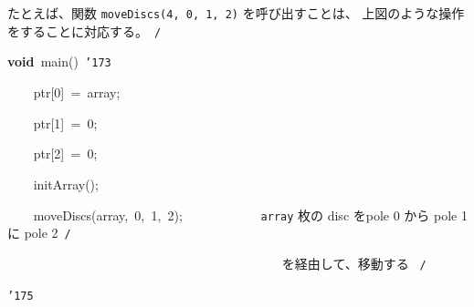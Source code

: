 \documentclass[a4paper,10pt]{article}
\def\mc{\relax}
\begin{document}
たとえば、関数 {\tt moveDiscs(4, 0, 1, 2)} を呼び出すことは、
上図のような操作をすることに対応する。\hfill \rm\mc \ {\tt *}{\tt /}
\tt\mc 

\noindent
\mbox{}\hfill

\noindent
\mbox{}\textbf{void}{\tt\mc \ }main(){\tt\mc \ }{\tt\char'173}

\noindent
\mbox{}{\tt\mc \ }{\tt\mc \ }{\tt\mc \ }{\tt\mc \ }ptr[0]{\tt\mc \ }={\tt\mc \ }array;

\noindent
\mbox{}{\tt\mc \ }{\tt\mc \ }{\tt\mc \ }{\tt\mc \ }ptr[1]{\tt\mc \ }={\tt\mc \ }0;

\noindent
\mbox{}{\tt\mc \ }{\tt\mc \ }{\tt\mc \ }{\tt\mc \ }ptr[2]{\tt\mc \ }={\tt\mc \ }0;

\noindent
\mbox{}\hfill

\noindent
\mbox{}{\tt\mc \ }{\tt\mc \ }{\tt\mc \ }{\tt\mc \ }initArray();

\noindent
\mbox{}{\tt\mc \ }{\tt\mc \ }{\tt\mc \ }{\tt\mc \ }moveDiscs(array,{\tt\mc \ }0,{\tt\mc \ }1,{\tt\mc \ }2);{\tt\mc \ }{\tt\mc \ }{\tt\mc \ }{\tt\mc \ }{\tt\mc \ }{\tt\mc \ }{\tt\mc \ }{\tt\mc \ }{\tt\mc \ }{\tt\mc \ }\rm\mc {\tt /}{\tt *}\  \ {\tt array} 枚の disc をpole 0 から pole 1 に pole 2\hfill \rm\mc \ {\tt *}{\tt /}
\tt\mc 

\noindent
\mbox{}{\tt\mc \ }{\tt\mc \ }{\tt\mc \ }{\tt\mc \ }{\tt\mc \ }{\tt\mc \ }{\tt\mc \ }{\tt\mc \ }{\tt\mc \ }{\tt\mc \ }{\tt\mc \ }{\tt\mc \ }{\tt\mc \ }{\tt\mc \ }{\tt\mc \ }{\tt\mc \ }{\tt\mc \ }{\tt\mc \ }{\tt\mc \ }{\tt\mc \ }{\tt\mc \ }{\tt\mc \ }{\tt\mc \ }{\tt\mc \ }{\tt\mc \ }{\tt\mc \ }{\tt\mc \ }{\tt\mc \ }{\tt\mc \ }{\tt\mc \ }{\tt\mc \ }{\tt\mc \ }{\tt\mc \ }{\tt\mc \ }{\tt\mc \ }{\tt\mc \ }{\tt\mc \ }{\tt\mc \ }{\tt\mc \ }{\tt\mc \ }\rm\mc {\tt /}{\tt *}\  \ を経由して、移動する \hfill \rm\mc \ {\tt *}{\tt /}
\tt\mc 

\noindent
\mbox{}{\tt\char'175}

\rm\mc
\end{document}
